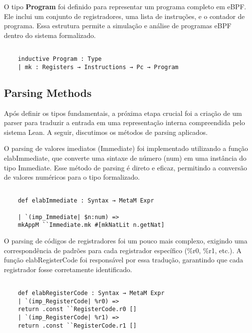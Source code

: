 \documentclass[sigconf]{acmart}
\begin{document}
O tipo \textbf{Program} foi definido para representar um programa completo em eBPF. Ele inclui um conjunto de registradores, uma lista de instruções, e o contador de programa. Essa estrutura permite a simulação e análise de programas eBPF dentro do sistema formalizado.

\begin{center}
\begin{verbatim}
    
    inductive Program : Type
    | mk : Registers → Instructions → Pc → Program

\end{verbatim}
\end{center}

\subsection{Parsing Methods}

Após definir os tipos fundamentais, a próxima etapa crucial foi a criação de um parser para traduzir a entrada em uma representação interna compreendida pelo sistema Lean. A seguir, discutimos os métodos de parsing aplicados.

O parsing de valores imediatos (Immediate) foi implementado utilizando a função elabImmediate, que converte uma sintaxe de número (num) em uma instância do tipo Immediate. Esse método de parsing é direto e eficaz, permitindo a conversão de valores numéricos para o tipo formalizado.
\begin{center}
\begin{verbatim}
        
    def elabImmediate : Syntax → MetaM Expr

    | `(imp_Immediate| $n:num) => 
    mkAppM ``Immediate.mk #[mkNatLit n.getNat]

\end{verbatim}
\end{center}

O parsing de códigos de registradores foi um pouco mais complexo, exigindo uma correspondência de padrões para cada registrador específico (\%r0, \%r1, etc.). A função elabRegisterCode foi responsável por essa tradução, garantindo que cada registrador fosse corretamente identificado.

\begin{center}
\begin{verbatim}
    
    def elabRegisterCode : Syntax → MetaM Expr  
    | `(imp_RegisterCode| %r0) => 
    return .const ``RegisterCode.r0 []
    | `(imp_RegisterCode| %r1) =>
    return .const ``RegisterCode.r1 []

\end{verbatim}
\end{center}
\end{document}
